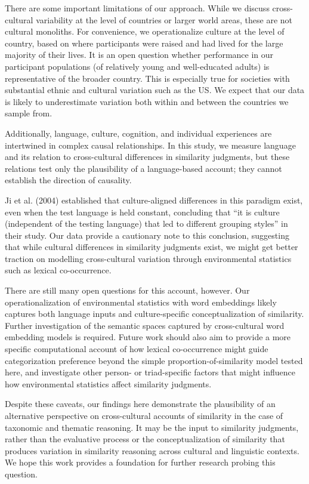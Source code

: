 \documentclass[10pt, letterpaper]{article}
\begin{document}
There are some important limitations of our approach. While we discuss
cross-cultural variability at the level of countries or larger world
areas, these are not cultural monoliths. For convenience, we
operationalize culture at the level of country, based on where
participants were raised and had lived for the large majority of their
lives. It is an open question whether performance in our participant
populations (of relatively young and well-educated adults) is
representative of the broader country. This is especially true for
societies with substantial ethnic and cultural variation such as the US.
We expect that our data is likely to underestimate variation both within
and between the countries we sample from.

Additionally, language, culture, cognition, and individual experiences
are intertwined in complex causal relationships. In this study, we
measure language and its relation to cross-cultural differences in
similarity judgments, but these relations test only the plausibility of
a language-based account; they cannot establish the direction of
causality.

Ji et al. (2004) established that culture-aligned differences in this
paradigm exist, even when the test language is held constant, concluding
that ``it is culture (independent of the testing language) that led to
different grouping styles'' in their study. Our data provide a
cautionary note to this conclusion, suggesting that while cultural
differences in similarity judgments exist, we might get better traction
on modelling cross-cultural variation through environmental statistics
such as lexical co-occurrence.

There are still many open questions for this account, however. Our
operationalization of environmental statistics with word embeddings
likely captures both language inputs and culture-specific
conceptualization of similarity. Further investigation of the semantic
spaces captured by cross-cultural word embedding models is required.
Future work should also aim to provide a more specific computational
account of how lexical co-occurrence might guide categorization
preference beyond the simple proportion-of-similarity model tested here,
and investigate other person- or triad-specific factors that might
influence how environmental statistics affect similarity judgments.

Despite these caveats, our findings here demonstrate the plausibility of
an alternative perspective on cross-cultural accounts of similarity in
the case of taxonomic and thematic reasoning. It may be the input to
similarity judgments, rather than the evaluative process or the
conceptualization of similarity that produces variation in similarity
reasoning across cultural and linguistic contexts. We hope this work
provides a foundation for further research probing this question.
\end{document}
